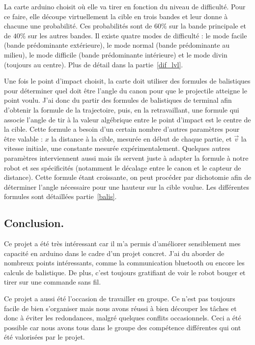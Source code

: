La carte arduino choisit où elle va tirer en fonction du niveau de difficulté. Pour ce faire, elle découpe virtuellement la cible en trois bandes et leur donne à chacune une probabilité. Ces probabilités sont de $60\%$ sur la bande principale et de $40\%$ sur les autres bandes. Il existe quatre modes de difficulté : le mode facile (bande prédominante extérieure), le mode normal (bande prédominante au milieu), le mode difficile (bande prédominante intérieure) et le mode divin (toujours au centre). Plus de détail dans la partie~\ref{dif_lvl}.

Une fois le point d'impact choisit, la carte doit utiliser des formules de balistiques pour déterminer quel doit être l'angle du canon pour que le projectile atteigne le point voulu. J'ai donc du partir des formules de balistiques de terminal afin d'obtenir la formule de la trajectoire, puis, en la retravaillant, une formule qui associe l'angle de tir à la valeur algébrique entre le point d'impact est le centre de la cible. Cette formule a besoin d'un certain nombre d'autres paramètres pour être valable : $x$ la distance à la cible, mesurée en début de chaque partie, et $\overrightarrow{v}$ la vitesse initiale, une constante mesurée expérimentalement. Quelques autres paramètres interviennent aussi mais ils servent juste à adapter la formule à notre robot et ses spécificités (notamment le décalage entre le canon et le capteur de distance). Cette formule étant croissante, on peut procéder par dichotomie afin de déterminer l'angle nécessaire pour une hauteur sur la cible voulue. Les différentes formules sont détaillées partie~\ref{balis}.

\subsection{Conclusion.}
Ce projet a été très intéressant car il m'a permis d'améliorer sensiblement mes capacité en arduino dans le cadre d'un projet concret. J'ai du aborder de nombreux points intéressants, comme la communication bluetooth ou encore les calculs de balistique. De plus, c'est toujours gratifiant de voir le robot bouger et tirer sur une commande sans fil.

Ce projet a aussi été l'occasion de travailler en groupe. Ce n'est pas toujours facile de bien s'organiser mais nous avons réussi à bien découper les tâches et donc à éviter les redondances, malgré quelques conflits occasionnels. Ceci a été possible car nous avons tous dans le groupe des compétence différentes qui ont été valorisées par le projet.

